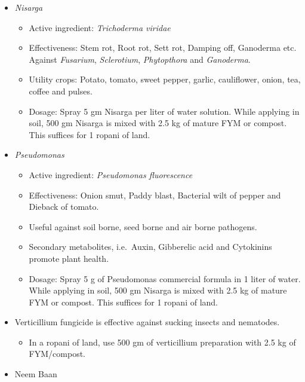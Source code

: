 \documentclass[]{book}
\providecommand{\tightlist}{%
  \setlength{\itemsep}{0pt}\setlength{\parskip}{0pt}}
\begin{document}
\begin{itemize}
\tightlist
\item
  \emph{Nisarga}

  \begin{itemize}
  \tightlist
  \item
    Active ingredient: \emph{Trichoderma viridae}
  \item
    Effectiveness: Stem rot, Root rot, Sett rot, Damping off, Ganoderma etc. Against \emph{Fusarium}, \emph{Sclerotium}, \emph{Phytopthora} and \emph{Ganoderma}.
  \item
    Utility crops: Potato, tomato, sweet pepper, garlic, cauliflower, onion, tea, coffee and pulses.
  \item
    Dosage: Spray 5 gm Nisarga per liter of water solution. While applying in soil, 500 gm Nisarga is mixed with 2.5 kg of mature FYM or compost. This suffices for 1 ropani of land.
  \end{itemize}
\item
  \emph{Pseudomonas}

  \begin{itemize}
  \tightlist
  \item
    Active ingredient: \emph{Pseudomonas fluorescence}
  \item
    Effectiveness: Onion smut, Paddy blast, Bacterial wilt of pepper and Dieback of tomato.
  \item
    Useful against soil borne, seed borne and air borne pathogens.
  \item
    Secondary metabolites, i.e.~Auxin, Gibberelic acid and Cytokinins promote plant health.
  \item
    Dosage: Spray 5 g of Pseudomonas commercial formula in 1 liter of water. While applying in soil, 500 gm Nisarga is mixed with 2.5 kg of mature FYM or compost. This suffices for 1 ropani of land.
  \end{itemize}
\item
  Verticillium fungicide is effective against sucking insects and nematodes.

  \begin{itemize}
  \tightlist
  \item
    In a ropani of land, use 500 gm of verticillium preparation with 2.5 kg of FYM/compost.
  \end{itemize}
\item
  Neem Baan


\end{itemize}
\end{document}
